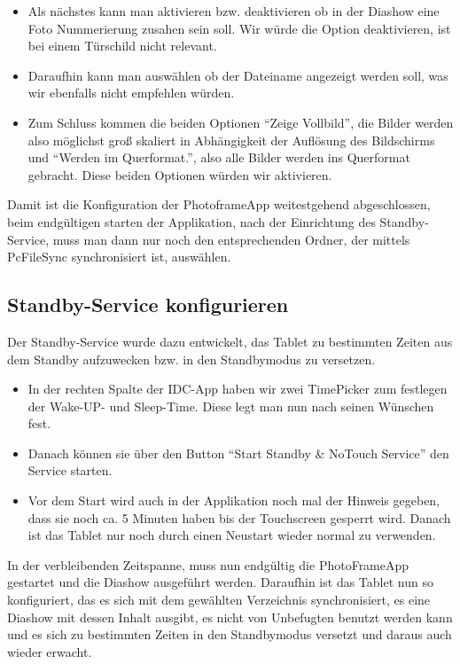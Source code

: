 \begin{flushleft}
\begin{itemize}
\begin{itemize}
        \item Als nächstes kann man aktivieren bzw. deaktivieren ob in der Diashow eine Foto Nummerierung zusahen sein soll. Wir würde die Option deaktivieren, ist bei einem Türschild nicht relevant.
        \item Daraufhin kann man auswählen ob der Dateiname angezeigt werden soll, was wir ebenfalls nicht empfehlen würden.
        \item Zum Schluss kommen die beiden Optionen ``Zeige Vollbild'', die Bilder werden also möglichst groß skaliert in Abhängigkeit der Auflösung des Bildschirms und ``Werden im Querformat.'', also alle Bilder werden ins Querformat gebracht. Diese beiden Optionen würden wir aktivieren.
      \end{itemize}
    \end{itemize}
    Damit ist die Konfiguration der PhotoframeApp weitestgehend abgeschlossen, beim endgültigen starten der Applikation, nach der Einrichtung des Standby-Service, muss man dann nur noch den entsprechenden Ordner, der mittels PcFileSync synchronisiert ist, auswählen.
  \subsection{Standby-Service konfigurieren}
    Der Standby-Service wurde dazu entwickelt, das Tablet zu bestimmten Zeiten aus dem Standby aufzuwecken bzw. in den Standbymodus zu versetzen.
    \begin{itemize}
      \item In der rechten Spalte der IDC-App haben wir zwei TimePicker zum festlegen der Wake-UP- und Sleep-Time. Diese legt man nun nach seinen Wünschen fest.
      \item Danach können sie über den Button ``Start Standby \& NoTouch Service'' den Service starten.
      \item Vor dem Start wird auch in der Applikation noch mal der Hinweis gegeben, dass sie noch ca. 5 Minuten haben bis der Touchscreen gesperrt wird. Danach ist das Tablet nur noch durch einen Neustart wieder normal zu verwenden.
    \end{itemize}
    In der verbleibenden Zeitspanne, muss nun endgültig die PhotoFrameApp gestartet und die Diashow ausgeführt werden. Daraufhin ist das Tablet nun so konfiguriert, das es sich mit dem gewählten Verzeichnis synchronisiert, es eine Diashow mit dessen Inhalt ausgibt, es nicht von Unbefugten benutzt werden kann und es sich zu bestimmten Zeiten in den Standbymodus versetzt und daraus auch wieder erwacht.
\end{flushleft}
